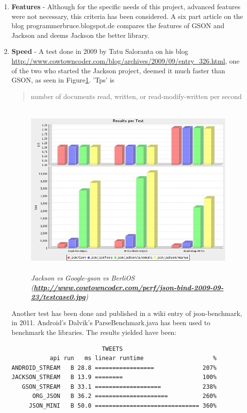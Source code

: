 \begin{enumerate}
  \item \textbf{Features} - Although for the specific needs of this project,
  advanced features were not necessary, this criteria has been considered. A
  six part article on the blog programmerbruce.blogspot.de compares the features
  of GSON and Jackson and deems Jackson the better library.
  
  \item \textbf{Speed} - A test done in 2009 by Tatu Saloranta on his blog
  \url{http://www.cowtowncoder.com/blog/archives/2009/09/entry_326.html}, one of
  the two who started the Jackson project, deemed it much faster than GSON, as
  seen in Figure\ref{fig:jacksonvsgson1}. 'Tps' is \begin{quote}number of
  documents read, written, or read-modify-written per second\end{quote}
   
  \begin{figure}
  \includegraphics[height=3.5in,width=6.23in]{./images/benchmarks/testcase0.jpg}
  \caption{\small \sl Jackson vs Google-gson vs BerliOS
  (\textbf{\url{http://www.cowtowncoder.com/perf/json-bind-2009-09-23/testcase0.jpg}})}
  \label{fig:jacksonvsgson1}
  \end{figure}
  
  Another test has been done and published in a wiki entry of json-benchmark,
  in 2011. Android's Dalvik's ParseBenchmark.java has been used to benchmark
  the libraries. The results yielded have been:\newline
  \begin{verbatim}
                          TWEETS                              
           api run   ms linear runtime                    % 
ANDROID_STREAM   B 28.8 =================              207% 
JACKSON_STREAM   B 13.9 ========                       100% 
   GSON_STREAM   B 33.1 ===================            238% 
      ORG_JSON   B 36.2 =====================          260% 
     JSON_MINI   B 50.0 ============================== 360% 


\end{verbatim}
\end{enumerate}

